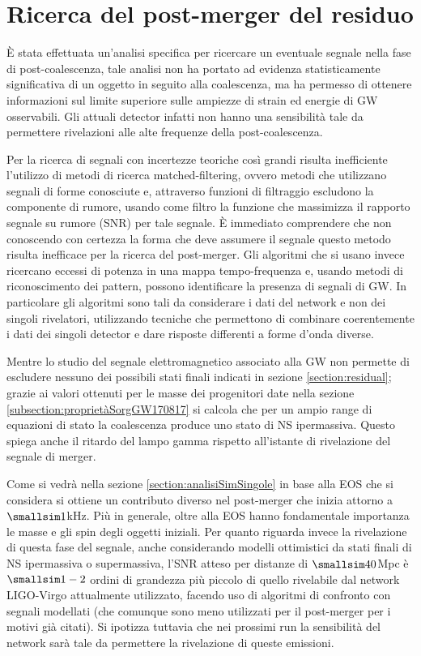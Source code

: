 \section{Ricerca del post-merger del residuo}
\label{section:postmergerGW170817}
È stata effettuata un'analisi specifica per ricercare un eventuale segnale nella fase di post-coalescenza, tale analisi non ha portato ad evidenza statisticamente significativa di un oggetto in seguito alla coalescenza, ma ha permesso di ottenere informazioni sul limite superiore sulle ampiezze di strain ed energie di GW osservabili. Gli attuali detector infatti non hanno una sensibilità tale da permettere rivelazioni alle alte frequenze della post-coalescenza.

Per la ricerca di segnali con incertezze teoriche così grandi risulta inefficiente l'utilizzo di metodi di ricerca matched-filtering, ovvero metodi che utilizzano segnali di forme conosciute e, attraverso funzioni di filtraggio escludono la componente di rumore, usando come filtro la funzione che massimizza il rapporto segnale su rumore (SNR) per tale segnale\cite{maggiore2008gravitational}. È immediato comprendere che non conoscendo con certezza la forma che deve assumere il segnale questo metodo risulta inefficace per la ricerca del post-merger. Gli algoritmi che si usano invece ricercano eccessi di potenza in una mappa tempo-frequenza e, usando metodi di riconoscimento dei pattern, possono identificare la presenza di segnali di GW. In particolare gli algoritmi sono tali da considerare i dati del network e non dei singoli rivelatori, utilizzando tecniche che permettono di combinare coerentemente i dati dei singoli detector e dare risposte differenti a forme d'onda diverse.

Mentre lo studio del segnale elettromagnetico associato alla GW non permette di escludere nessuno dei possibili stati finali indicati in sezione \ref{section:residual}; grazie ai valori ottenuti per le masse dei progenitori date nella sezione \ref{subsection:proprietàSorgGW170817} si calcola che per un ampio range di equazioni di stato la coalescenza produce uno stato di NS ipermassiva. Questo spiega anche il ritardo del lampo gamma rispetto all'istante di rivelazione del segnale di merger. 

Come si vedrà nella sezione \ref{section:analisiSimSingole} in base alla EOS che si considera si ottiene un contributo diverso nel post-merger che inizia attorno a $\smallsim1$kHz. Più in generale, oltre alla EOS hanno fondamentale importanza le masse e gli spin degli oggetti iniziali. 
Per quanto riguarda invece la rivelazione di questa fase del segnale, anche considerando modelli ottimistici da stati finali di NS ipermassiva o supermassiva, l'SNR atteso per distanze di $\smallsim40$Mpc è $\smallsim1-2$ ordini di grandezza più piccolo di quello rivelabile dal network LIGO-Virgo attualmente utilizzato, facendo uso di algoritmi di confronto con segnali modellati (che comunque sono meno utilizzati per il post-merger per i motivi già citati).
Si ipotizza tuttavia che nei prossimi run la sensibilità del network sarà tale da permettere la rivelazione di queste emissioni\cite{Abbott_2017b}.

